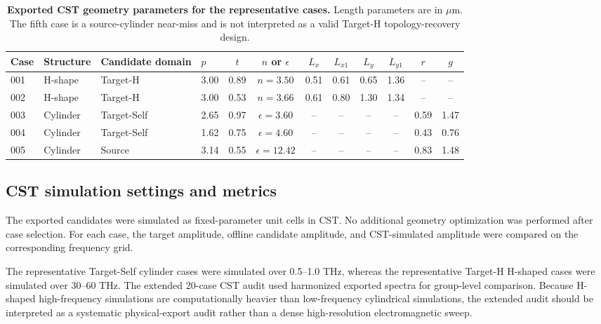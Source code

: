 \documentclass[final,1p,times]{elsarticle}
\begin{document}
\begin{table}[htbp!]
\centering
\caption{\textbf{Exported CST geometry parameters for the representative cases.}
Length parameters are in $\mu$m. The fifth case is a source-cylinder near-miss and is not interpreted as a valid Target-H topology-recovery design.}
\label{tab:si_phase5_geometry_parameters}
\scriptsize
\setlength{\tabcolsep}{3.2pt}
\renewcommand{\arraystretch}{1.12}
\begin{tabular}{llllcccccccc}
\toprule
Case & Structure & Candidate domain & $p$ & $t$ & $n$ or $\epsilon$ & $L_x$ & $L_{x1}$ & $L_y$ & $L_{y1}$ & $r$ & $g$ \\
\midrule
001 & H-shape & Target-H & 3.00 & 0.89 & $n=3.50$ & 0.51 & 0.61 & 0.65 & 1.36 & -- & -- \\
002 & H-shape & Target-H & 3.00 & 0.53 & $n=3.66$ & 0.61 & 0.80 & 1.30 & 1.34 & -- & -- \\
003 & Cylinder & Target-Self & 2.65 & 0.97 & $\epsilon=3.60$ & -- & -- & -- & -- & 0.59 & 1.47 \\
004 & Cylinder & Target-Self & 1.62 & 0.75 & $\epsilon=4.60$ & -- & -- & -- & -- & 0.43 & 0.76 \\
005 & Cylinder & Source & 3.14 & 0.55 & $\epsilon=12.42$ & -- & -- & -- & -- & 0.83 & 1.48 \\
\bottomrule
\end{tabular}
\end{table}

\subsection{CST simulation settings and metrics}

The exported candidates were simulated as fixed-parameter unit cells in CST. No additional geometry optimization was performed after case selection. For each case, the target amplitude, offline candidate amplitude, and CST-simulated amplitude were compared on the corresponding frequency grid.

The representative Target-Self cylinder cases were simulated over 0.5--1.0 THz, whereas the representative Target-H H-shaped cases were simulated over 30--60 THz. The extended 20-case CST audit used harmonized exported spectra for group-level comparison. Because H-shaped high-frequency simulations are computationally heavier than low-frequency cylindrical simulations, the extended audit should be interpreted as a systematic physical-export audit rather than a dense high-resolution electromagnetic sweep.
\end{document}
